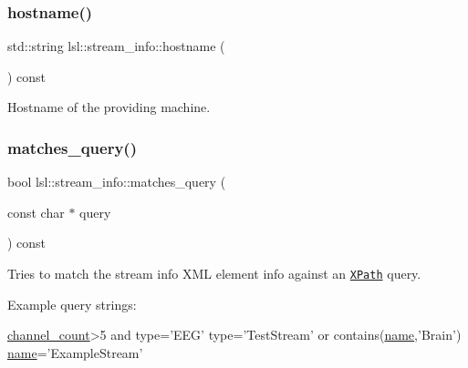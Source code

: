 \subsubsection{\texorpdfstring{hostname()}{hostname()}}
{\footnotesize\ttfamily std\+::string lsl\+::stream\+\_\+info\+::hostname (\begin{DoxyParamCaption}{ }\end{DoxyParamCaption}) const\hspace{0.3cm}{\ttfamily [inline]}}

Hostname of the providing machine. \mbox{\label{classlsl_1_1stream__info_a6c3474322d467e8d8198c7a6e4c7ad76}} 
\subsubsection{\texorpdfstring{matches\+\_\+query()}{matches\_query()}}
{\footnotesize\ttfamily bool lsl\+::stream\+\_\+info\+::matches\+\_\+query (\begin{DoxyParamCaption}\item[{const char $\ast$}]{query }\end{DoxyParamCaption}) const\hspace{0.3cm}{\ttfamily [inline]}}





Tries to match the stream info X\+ML element {\ttfamily info} against an \href{https://en.wikipedia.org/wiki/XPath#Syntax_and_semantics_(XPath_1.0)}{\tt X\+Path} query.

Example query strings\+: 
\begin{DoxyCode}
\hyperlink{classlsl_1_1stream__info_acf09957c1c61a9d9e0f9439037eec305}{channel\_count}>5 and type=\textcolor{stringliteral}{'EEG'}
type=\textcolor{stringliteral}{'TestStream'} or contains(\hyperlink{classlsl_1_1stream__info_a0862e5c580d65ecf9ceb1fcc26f2ca34}{name},\textcolor{stringliteral}{'Brain'})
\hyperlink{classlsl_1_1stream__info_a0862e5c580d65ecf9ceb1fcc26f2ca34}{name}='ExampleStream'
\end{DoxyCode}
 \mbox{\label{classlsl_1_1stream__info_a0862e5c580d65ecf9ceb1fcc26f2ca34}} 
